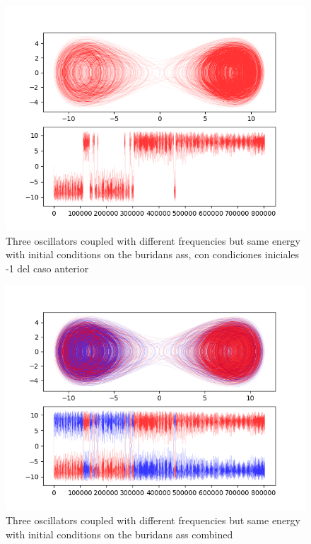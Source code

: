 \documentclass[idxtotoc,hyperref,openany]{labbook} %
\begin{document}
\begin{figure}[H] %
\begin{center}
\includegraphics[width=1\linewidth]{tres_osci_otro_intento_neg.png}
\end{center}
\caption{Three oscillators coupled with different frequencies but same energy with initial conditions on the buridans ass, con condiciones iniciales -1 del caso anterior}
\label{fig:three_osci_diff_freq_same_energy_neg}
\end{figure}

\begin{figure}[H] %
\begin{center}
\includegraphics[width=1\linewidth]{tres_osci_otro_intento_con_neg.png}
\end{center}
\caption{Three oscillators coupled with different frequencies but same energy with initial conditions on the buridans ass combined}
\label{fig:three_osci_diff_freq_same_energy_neg_pos}
\end{figure}
\end{document}
